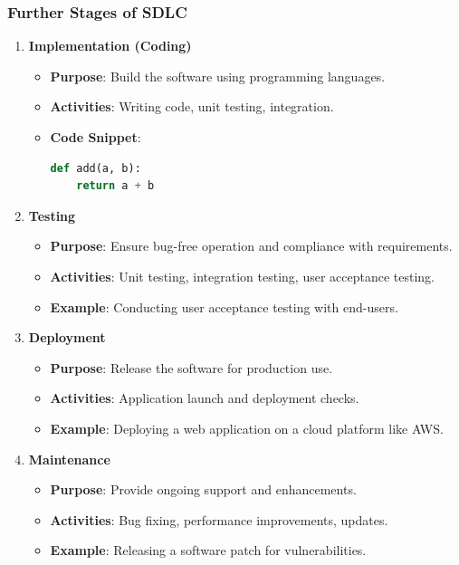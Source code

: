 \documentclass{beamer}
\begin{document}
\begin{frame}[fragile]
    \frametitle{Further Stages of SDLC}
    \begin{enumerate}[resume]
        \item \textbf{Implementation (Coding)}
        \begin{itemize}
            \item \textbf{Purpose}: Build the software using programming languages.
            \item \textbf{Activities}: Writing code, unit testing, integration.
            \item \textbf{Code Snippet}:
            \begin{lstlisting}[language=Python]
def add(a, b):
    return a + b
            \end{lstlisting}
            \end{itemize}
        
        \item \textbf{Testing}
        \begin{itemize}
            \item \textbf{Purpose}: Ensure bug-free operation and compliance with requirements.
            \item \textbf{Activities}: Unit testing, integration testing, user acceptance testing.
            \item \textbf{Example}: Conducting user acceptance testing with end-users.
        \end{itemize}

        \item \textbf{Deployment}
        \begin{itemize}
            \item \textbf{Purpose}: Release the software for production use.
            \item \textbf{Activities}: Application launch and deployment checks.
            \item \textbf{Example}: Deploying a web application on a cloud platform like AWS.
        \end{itemize}

        \item \textbf{Maintenance}
        \begin{itemize}
            \item \textbf{Purpose}: Provide ongoing support and enhancements.
            \item \textbf{Activities}: Bug fixing, performance improvements, updates.
            \item \textbf{Example}: Releasing a software patch for vulnerabilities.
        \end{itemize}
    \end{enumerate}
\end{frame}
\end{document}
